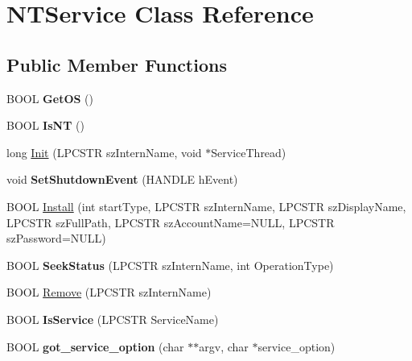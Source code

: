 \hypertarget{classNTService}{}\section{N\+T\+Service Class Reference}
\label{classNTService}
\subsection*{Public Member Functions}
\begin{DoxyCompactItemize}
\item 
\mbox{\label{classNTService_a47ab7daea04c69ece78af056970721bf}} 
B\+O\+OL {\bfseries Get\+OS} ()
\item 
\mbox{\label{classNTService_ade05f348b06712a570cfa7ced272b0c4}} 
B\+O\+OL {\bfseries Is\+NT} ()
\item 
long \mbox{\hyperlink{classNTService_a7d64ca859f231aa1aacc56832cc0d641}{Init}} (L\+P\+C\+S\+TR sz\+Intern\+Name, void $\ast$Service\+Thread)
\item 
\mbox{\label{classNTService_aef2d62afcedfe554278a3c4c543aec78}} 
void {\bfseries Set\+Shutdown\+Event} (H\+A\+N\+D\+LE h\+Event)
\item 
B\+O\+OL \mbox{\hyperlink{classNTService_aab2e98bbe52de94d66b64f7a27e68c5b}{Install}} (int start\+Type, L\+P\+C\+S\+TR sz\+Intern\+Name, L\+P\+C\+S\+TR sz\+Display\+Name, L\+P\+C\+S\+TR sz\+Full\+Path, L\+P\+C\+S\+TR sz\+Account\+Name=N\+U\+LL, L\+P\+C\+S\+TR sz\+Password=N\+U\+LL)
\item 
\mbox{\label{classNTService_afbcd908aa72f88c873751406e6b01b03}} 
B\+O\+OL {\bfseries Seek\+Status} (L\+P\+C\+S\+TR sz\+Intern\+Name, int Operation\+Type)
\item 
B\+O\+OL \mbox{\hyperlink{classNTService_a24da61426d7e37165a94a421f58737e0}{Remove}} (L\+P\+C\+S\+TR sz\+Intern\+Name)
\item 
\mbox{\label{classNTService_aa78464b9d48b5db26774cc76beb6e7ed}} 
B\+O\+OL {\bfseries Is\+Service} (L\+P\+C\+S\+TR Service\+Name)
\item 
\mbox{\label{classNTService_ad88538e58c5d07092f22185b55112a3e}} 
B\+O\+OL {\bfseries got\+\_\+service\+\_\+option} (char $\ast$$\ast$argv, char $\ast$service\+\_\+option)
$$
\end{DoxyCompactItemize}
